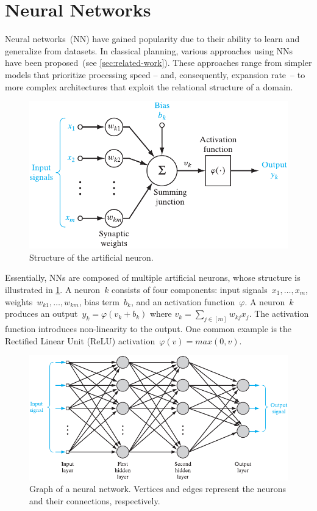 \section{Neural Networks}
\label{sec:neural-networks}

Neural networks~(NN) have gained popularity due to their ability to learn and generalize from datasets. In classical planning, various approaches using NNs have been proposed~(see \cref{sec:related-work}). These approaches range from simpler models that prioritize processing speed -- and, consequently, expansion rate~-- to more complex architectures that exploit the relational structure of a domain.

\begin{figure}[tb]
    \caption{Structure of the artificial neuron.}
    \label{fig:neuron}
    \addmargin
    \centering
    \includegraphics[width=0.8\linewidth]{figures/neuron.pdf}
    \addmargin
\end{figure}

Essentially, NNs are composed of multiple artificial neurons, whose structure is illustrated in \cref{fig:neuron}. A neuron~$k$ consists of four components: input signals~$x_1,\ldots,x_m$, weights~$w_{k1},\ldots,w_{km}$, bias term~$b_k$, and an activation function~$\varphi$. A neuron~$k$ produces an output~$y_k = \varphi(v_k + b_k)$ where $v_k = \sum_{j \in [m]} w_{kj} x_j$. The activation function introduces non-linearity to the output. One common example is the Rectified Linear Unit (ReLU) activation~$\varphi(v) = max(0,v)$.

\begin{figure}[tb]
    \caption[Graph of a neural network.]{Graph of a neural network. Vertices and edges represent the neurons and their connections, respectively.}
    \label{fig:neuralnetwork}
    \addmargin
    \centering
    \includegraphics[width=0.9\linewidth]{figures/network.pdf}
    \addmargin
\end{figure}

